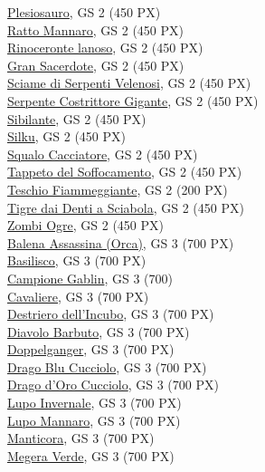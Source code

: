 \begin{multicols}{3}
{\hyperlink{Plesiosauro}{Plesiosauro}, GS 2 (450 PX)\\
\hyperlink{Ratto Mannaro}{Ratto Mannaro}, GS 2 (450 PX)\\
\hyperlink{Rinoceronte lanoso}{Rinoceronte lanoso}, GS 2 (450 PX)\\
\hyperlink{Gran Sacerdote}{Gran Sacerdote}, GS 2 (450 PX)\\
\hyperlink{Sciame di Serpenti Velenosi}{Sciame di Serpenti Velenosi}, GS 2 (450 PX)\\
\hyperlink{Serpente Costrittore Gigante}{Serpente Costrittore Gigante}, GS 2 (450 PX)\\
\hyperlink{Sibilante}{Sibilante}, GS 2 (450 PX)\\
\hyperlink{Silku}{Silku}, GS 2 (450 PX)\\
\hyperlink{Squalo Cacciatore}{Squalo Cacciatore}, GS 2 (450 PX)\\
\hyperlink{Tappeto del Soffocamento}{Tappeto del Soffocamento}, GS 2 (450 PX)\\
\hyperlink{Teschio Fiammeggiante}{Teschio Fiammeggiante}, GS 2 (200 PX)\\
\hyperlink{Tigre dai Denti a Sciabola}{Tigre dai Denti a Sciabola}, GS 2 (450 PX)\\
\hyperlink{Zombi Ogre}{Zombi Ogre}, GS 2 (450 PX)\\
\hyperlink{Balena Assassina (Orca)}{Balena Assassina (Orca)}, GS 3 (700 PX)\\
\hyperlink{Basilisco}{Basilisco}, GS 3 (700 PX)\\
\hyperlink{Campione Gablin}{Campione Gablin}, GS 3 (700)\\
\hyperlink{Cavaliere}{Cavaliere}, GS 3 (700 PX)\\
\hyperlink{Destriero dell'Incubo}{Destriero dell'Incubo}, GS 3 (700 PX)\\
\hyperlink{Diavolo Barbuto}{Diavolo Barbuto}, GS 3 (700 PX)\\
\hyperlink{Doppelganger}{Doppelganger}, GS 3 (700 PX)\\
\hyperlink{Drago Blu Cucciolo}{Drago Blu Cucciolo}, GS 3 (700 PX)\\
\hyperlink{Drago d'Oro Cucciolo}{Drago d'Oro Cucciolo}, GS 3 (700 PX)\\
\hyperlink{Lupo Invernale}{Lupo Invernale}, GS 3 (700 PX)\\
\hyperlink{Lupo Mannaro}{Lupo Mannaro}, GS 3 (700 PX)\\
\hyperlink{Manticora}{Manticora}, GS 3 (700 PX)\\
\hyperlink{Megera Verde}{Megera Verde}, GS 3 (700 PX)\\
}
\end{multicols}
